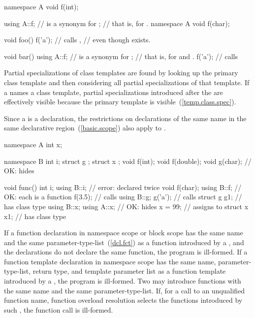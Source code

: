 \begin{codeblock}
namespace A {
  void f(int);
}

using A::f;         //  is a synonym for ;
                    // that is, for .
namespace A {
  void f(char);
}

void foo() {
  f('a');           // calls ,
}                   // even though  exists.

void bar() {
  using A::f;       //  is a synonym for ;
                    // that is, for  and .
  f('a');           // calls 
}
\end{codeblock}
\exitexample

\pnum
\enternote
Partial specializations of class templates are found by looking up the
primary class template and then considering all partial specializations
of that template. If a  names a class
template, partial specializations introduced after the
 are effectively visible because the primary
template is visible~(\ref{temp.class.spec}).
\exitnote

\pnum
Since a  is a declaration, the restrictions
on declarations of the same name in the same declarative
region~(\ref{basic.scope}) also apply to .
\enterexample

\begin{codeblock}
namespace A {
  int x;
}

namespace B {
  int i;
  struct g { };
  struct x { };
  void f(int);
  void f(double);
  void g(char);     // OK: hides 
}

void func() {
  int i;
  using B::i;       // error:  declared twice
  void f(char);
  using B::f;       // OK: each  is a function
  f(3.5);           // calls 
  using B::g;
  g('a');           // calls 
  struct g g1;      //  has class type 
  using B::x;
  using A::x;       // OK: hides 
  x = 99;           // assigns to 
  struct x x1;      //  has class type 
}
\end{codeblock}
\exitexample

\pnum
If a function declaration in namespace scope or block scope has the same
name and the same parameter-type-list~(\ref{dcl.fct}) as
a function introduced by a , and the
declarations do not declare the same function, the program is
ill-formed. If a function template declaration in namespace scope has
the same name, parameter-type-list, return type, and template
parameter list as a function template introduced by a
, the program is ill-formed.
\enternote
Two  may introduce functions with the same
name and the same parameter-type-list. If, for a call to an unqualified
function name, function overload resolution selects the functions
introduced by such , the function call is
ill-formed.
\enterexample

